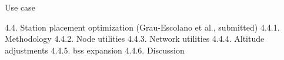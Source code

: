 Use case

4.4.	Station placement optimization (Grau-Escolano et al., submitted)
4.4.1.	Methodology
4.4.2.	 Node utilities
4.4.3.	 Network utilities
4.4.4.	 Altitude adjustments
4.4.5.	 \acs{bss} expansion
4.4.6.	 Discussion
